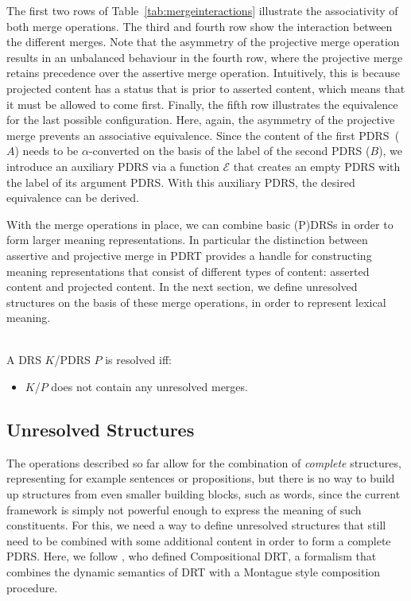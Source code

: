 \noindent The first two rows of Table~\ref{tab:mergeinteractions} illustrate
the associativity of both merge operations. The third and fourth row show
the interaction between the different merges. Note that the asymmetry of the
projective merge operation results in an unbalanced behaviour in the fourth
row, where the projective merge retains precedence over the assertive merge
operation. Intuitively, this is because projected content has a status that
is prior to asserted content, which means that it must be allowed to come
first.  Finally, the fifth row illustrates the equivalence for the last
possible configuration. Here, again, the asymmetry of the projective merge
prevents an associative equivalence. Since the content of the first
PDRS~($A$) needs to be $\alpha$-converted on the basis of the label of the
second PDRS ($B$), we introduce an auxiliary PDRS via a function
$\mathcal{E}$ that creates an empty PDRS with the label of its argument
PDRS. With this auxiliary PDRS, the desired equivalence can be derived.

With the merge operations in place, we can combine basic (P)DRSs in order to
form larger meaning representations. In particular the distinction between
assertive and projective merge in PDRT provides a handle for constructing
meaning representations that consist of different types of content: asserted
content and projected content. In the next section, we define unresolved
structures on the basis of these merge operations, in order to represent
lexical meaning.

\begin{definition}[Resolvedness]~\\
A DRS $K$/PDRS $P$ is resolved iff:
\begin{itemize}
  \item $K$/$P$ does not contain any unresolved merges.
\end{itemize}
\end{definition}

\subsection{Unresolved Structures}\label{sec:unresolved}

The operations described so far allow for the combination of \emph{complete}
structures, representing for example sentences or propositions, but there is
no way to build up structures from even smaller building blocks, such as
words, since the current framework is simply not powerful enough to express
the meaning of such constituents. For this, we need a way to define
unresolved structures that still need to be combined with some additional
content in order to form a complete PDRS.  Here, we follow
, who defined Compositional DRT,
a formalism that combines the dynamic semantics of DRT with a Montague style
composition procedure.

